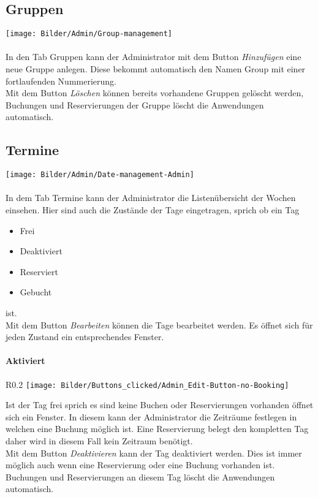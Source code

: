 \subsection{Gruppen}
	\texttt{[image: Bilder/Admin/Group-management]}
	\\
	\\	
In den Tab Gruppen kann der Administrator mit dem Button \textit{Hinzufügen} eine neue Gruppe anlegen. Diese bekommt automatisch den Namen Group mit einer fortlaufenden Nummerierung.\\Mit dem Button \textit{Löschen} können bereits vorhandene Gruppen gelöscht werden, Buchungen und Reservierungen der Gruppe löscht die Anwendungen automatisch.

\subsection{Termine}
	\texttt{[image: Bilder/Admin/Date-management-Admin]}
	\\
	\\
In dem Tab Termine kann der Administrator die Listenübersicht der Wochen einsehen. Hier sind auch die Zustände der Tage eingetragen, sprich ob ein Tag
\begin{itemize}
	\item Frei 
	\item Deaktiviert 
	\item Reserviert 
	\item Gebucht
\end{itemize}
ist.
\\ Mit dem Button \textit{Bearbeiten} können die Tage bearbeitet werden. Es öffnet sich für jeden Zustand ein entsprechendes Fenster.


\paragraph{Aktiviert}
\begin{wrapfigure}{R}{0.2\textwidth}
	\centering
	\texttt{[image: Bilder/Buttons\_clicked/Admin\_Edit-Button-no-Booking]}
\end{wrapfigure}
Ist der Tag frei sprich es sind keine Buchen oder Reservierungen vorhanden öffnet sich ein Fenster. In diesem kann der Administrator die Zeiträume festlegen in welchen eine Buchung möglich ist. Eine Reservierung belegt den kompletten Tag daher wird in diesem Fall kein Zeitraum benötigt.  
\\Mit dem Button \textit{Deaktivieren} kann der Tag deaktiviert werden. Dies ist immer möglich auch wenn eine Reservierung oder eine Buchung vorhanden ist. Buchungen und Reservierungen an diesem Tag löscht die Anwendungen automatisch.


